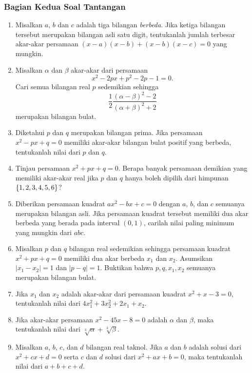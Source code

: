 	\subsubsection{Bagian Kedua \dashh Soal Tantangan}
		
		\begin{enumerate}[nosep]
			\item Misalkan $ a $, $ b $ dan $ c $ adalah tiga bilangan \textit{berbeda}. Jika ketiga bilangan tersebut merupakan bilangan asli satu digit, tentukanlah jumlah terbesar akar-akar persamaan $ \left(x - a\right)\left(x- b\right) + \left(x - b\right)\left(x - c\right) = 0 $ yang mungkin.
			\item Misalkan $ \alpha $ dan $ \beta $ akar-akar dari persamaan
			\[ x^{2} - 2px + p^{2} - 2p - 1 = 0. \]
			Cari semua bilangan real $ p $ sedemikian sehingga
			\[ \frac{1}{2}\frac{\left(\alpha - \beta\right)^{2} - 2}{\left(\alpha + \beta\right)^{2} + 2} \]
			merupakan bilangan bulat.
			\item Diketahui $ p $ dan $ q $ merupakan bilangan prima. Jika persamaan $ x^{2} - px + q = 0 $ memiliki akar-akar bilangan bulat positif yang berbeda, tentukanlah nilai dari $ p $ dan $ q $.
			\item Tinjau persamaan $ x^{2} + px + q = 0 $. Berapa banyak persamaan demikian yang memiliki akar-akar real jika $ p $ dan $ q $ hanya boleh dipilih dari himpunan $ \mathop{}\!\left\lbrace1, 2, 3, 4, 5, 6\right\rbrace $?
			\item Diberikan persamaan kuadrat $ ax^{2} - bx + c = 0 $ dengan $ a $, $ b $, dan $ c $ semuanya merupakan bilangan asli. Jika persamaan kuadrat tersebut memiliki dua akar berbeda yang berada pada interval $ \left(0, 1\right) $, carilah nilai paling minimum yang mungkin dari $ abc $.
			\item {} Misalkan $ p $ dan $ q $ bilangan real sedemikian sehingga persamaan kuadrat $ x^{2} + px + q = 0 $ memiliki dua akar berbeda $ x_{1} $ dan $ x_{2} $. Asumsikan $ \left|x_{1} - x_{2}\right| = 1 $ dan $ \left|p - q\right| = 1 $. Buktikan bahwa $ p, q, x_{1}, x_{2} $ semuanya merupakan bilangan bulat.
			\item Jika $ x_{1} $ dan $ x_{2} $ adalah akar-akar dari persamaan kuadrat $ x^{2} + x - 3 = 0 $, tentukanlah nilai dari $ 4x_{1}^{2} + 3x_{2}^{2} + 2x_{1} + x_{2} $.
			\item Jika akar-akar persamaan $ x^{2} - 45x - 8 = 0 $ adalah $ \alpha $ dan $ \beta $, maka tentukanlah nilai dari $ \sqrt[3]{\alpha} + \sqrt[3]{\beta} $.
			\item Misalkan $ a $, $ b $, $ c $, dan $ d $ bilangan real taknol. Jika $ a $ dan $ b $ adalah solusi dari $ x^{2} + cx + d = 0 $ serta $ c $ dan $ d $ solusi dari $ x^{2} + ax + b = 0 $, maka tentukanlah nilai dari $ a + b + c + d $.

\end{enumerate}
